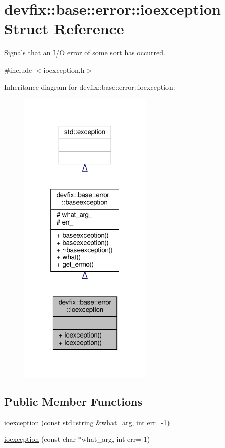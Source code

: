 \hypertarget{structdevfix_1_1base_1_1error_1_1ioexception}{}\section{devfix\+:\+:base\+:\+:error\+:\+:ioexception Struct Reference}
\label{structdevfix_1_1base_1_1error_1_1ioexception}


Signals that an I/O error of some sort has occurred.  




{\ttfamily \#include $<$ioexception.\+h$>$}



Inheritance diagram for devfix\+:\+:base\+:\+:error\+:\+:ioexception\+:\nopagebreak
\begin{figure}[H]
\begin{center}
\leavevmode
\includegraphics[width=181pt]{structdevfix_1_1base_1_1error_1_1ioexception__inherit__graph}
\end{center}
\end{figure}
\subsection*{Public Member Functions}
\begin{DoxyCompactItemize}
\item 
\hyperlink{structdevfix_1_1base_1_1error_1_1ioexception_acaf6aa89dc63021cbf6241b897c570da}{ioexception} (const std\+::string \&what\+\_\+arg, int err=-\/1)
\item 
\hyperlink{structdevfix_1_1base_1_1error_1_1ioexception_a93e7dfc50605b9f6a9c5cd78dac59a44}{ioexception} (const char $\ast$what\+\_\+arg, int err=-\/1)
\end{DoxyCompactItemize}
